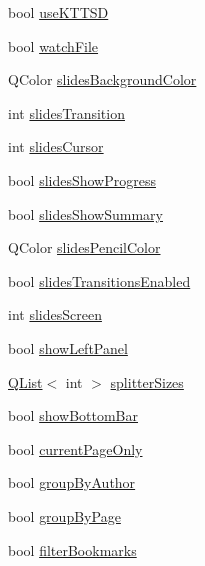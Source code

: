 \begin{DoxyCompactItemize}
\item 
bool \hyperlink{classOkular_1_1SettingsPrivate_a9142816951c834f3bd7753b6746ef4c2}{use\+K\+T\+T\+S\+D}
\item 
bool \hyperlink{classOkular_1_1SettingsPrivate_a4a188b886854f837c336215b519b3bcf}{watch\+File}
\item 
Q\+Color \hyperlink{classOkular_1_1SettingsPrivate_a11f64298e45757b748004b576448cf5b}{slides\+Background\+Color}
\item 
int \hyperlink{classOkular_1_1SettingsPrivate_a0332fa4a91512006b7c4ddcc4e979b37}{slides\+Transition}
\item 
int \hyperlink{classOkular_1_1SettingsPrivate_ad929dff4ddff7595b0f4c50bdbd4c091}{slides\+Cursor}
\item 
bool \hyperlink{classOkular_1_1SettingsPrivate_a9f7e1778a473ab4fca45f816a21d1254}{slides\+Show\+Progress}
\item 
bool \hyperlink{classOkular_1_1SettingsPrivate_a15e8ffa873a442611e65c8a00c342c8f}{slides\+Show\+Summary}
\item 
Q\+Color \hyperlink{classOkular_1_1SettingsPrivate_af415c5e60b769ab43abd82ff9925be41}{slides\+Pencil\+Color}
\item 
bool \hyperlink{classOkular_1_1SettingsPrivate_a7d05aafe4b651b151b139b0bfc23aa07}{slides\+Transitions\+Enabled}
\item 
int \hyperlink{classOkular_1_1SettingsPrivate_a0889218d8b0d45ad198dc4535ecfe0ca}{slides\+Screen}
\item 
bool \hyperlink{classOkular_1_1SettingsPrivate_afbeeb8fbbad4a37e416e6c716c75ea03}{show\+Left\+Panel}
\item 
\hyperlink{classQList}{Q\+List}$<$ int $>$ \hyperlink{classOkular_1_1SettingsPrivate_aece94cfa10fd07eaa728409e50320fb7}{splitter\+Sizes}
\item 
bool \hyperlink{classOkular_1_1SettingsPrivate_a9aa0a34dc52345d31430cb93ebb23b73}{show\+Bottom\+Bar}
\item 
bool \hyperlink{classOkular_1_1SettingsPrivate_af179ccdc3a2baac363aafae958493a8d}{current\+Page\+Only}
\item 
bool \hyperlink{classOkular_1_1SettingsPrivate_a318c47ddf7d2f0ee5688930d2bde7adb}{group\+By\+Author}
\item 
bool \hyperlink{classOkular_1_1SettingsPrivate_a9281d10efd51e2db1aca3b77486837da}{group\+By\+Page}
\item 
bool \hyperlink{classOkular_1_1SettingsPrivate_a0b97ff99fdd60cfcd3ee5da1f223343a}{filter\+Bookmarks}
\item 

\end{DoxyCompactItemize}
